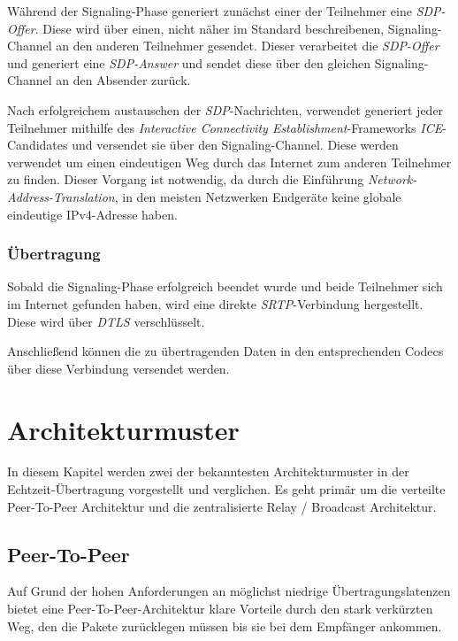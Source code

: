 \documentclass{article}
\begin{document}
\begin{onecolumn}
Während der Signaling-Phase generiert zunächst einer der Teilnehmer eine
\textit{SDP-Offer}. Diese wird über einen, nicht näher im Standard
beschreibenen, Signaling-Channel an den anderen Teilnehmer gesendet.
Dieser verarbeitet die \textit{SDP-Offer} und generiert eine
\textit{SDP-Answer} und sendet diese über den gleichen Signaling-Channel an den
Absender zurück.

Nach erfolgreichem austauschen der \textit{SDP}-Nachrichten,
verwendet generiert jeder Teilnehmer mithilfe des \textit{Interactive
Connectivity Establishment}-Frameworks \textit{ICE}-Candidates und versendet
sie über den Signaling-Channel. Diese werden verwendet um einen eindeutigen
Weg durch das Internet zum anderen Teilnehmer zu finden. Dieser Vorgang ist
notwendig, da durch die Einführung \textit{Network-Address-Translation}, in den
meisten Netzwerken Endgeräte keine globale eindeutige IPv4-Adresse
haben.~\cite{MDNSessionLifetime}

\subsubsection{Übertragung}

Sobald die Signaling-Phase erfolgreich beendet wurde und beide Teilnehmer sich
im Internet gefunden haben, wird eine direkte \textit{SRTP}-Verbindung
hergestellt.~\cite{RFC8834} Diese wird über \textit{DTLS}
verschlüsselt.~\cite{RFC8827}

Anschließend können die zu übertragenden Daten in den entsprechenden Codecs
über diese Verbindung versendet werden.

\section{Architekturmuster}

In diesem Kapitel werden zwei der bekanntesten Architekturmuster in der
Echtzeit-Übertragung vorgestellt und verglichen. Es geht primär um die
verteilte Peer-To-Peer Architektur und die zentralisierte Relay / Broadcast
Architektur.

\subsection{Peer-To-Peer}

Auf Grund der hohen Anforderungen an möglichst niedrige Übertragungslatenzen
bietet eine Peer-To-Peer-Architektur klare Vorteile durch den stark verkürzten
Weg, den die Pakete zurücklegen müssen bis sie bei dem Empfänger ankommen.


\end{onecolumn}
\end{document}
